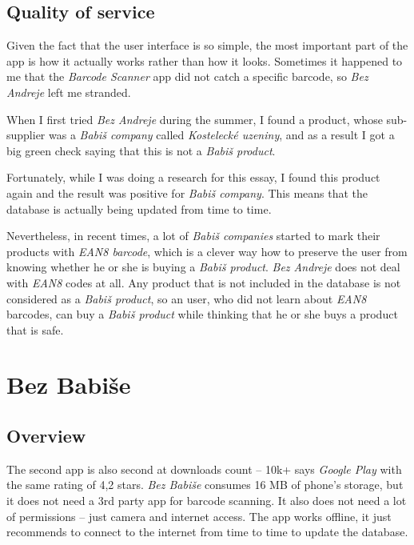 \documentclass[12pt]{article} %
\begin{document}

\subsection{Quality of service} %

Given the fact that the user interface is so simple, the most important part of the app is how it actually works rather than how it looks. Sometimes it happened to me that the \textit{Barcode Scanner} app did not catch a specific barcode, so \textit{Bez Andreje} left me stranded.

\newpage
When I first tried \textit{Bez Andreje} during the summer, I found a product, whose sub-supplier was a \textit{Babiš company} called \textit{Kostelecké uzeniny}, and as a result I got a big green check saying that this is not a \textit{Babiš product}.

Fortunately, while I was doing a research for this essay, I found this product again and the result was positive for \textit{Babiš company}. This means that the database is actually being updated from time to time. 

Nevertheless, in recent times, a lot of \textit{Babiš companies} started to mark their products with \textit{EAN8 barcode}, which is a clever way how to preserve the user from knowing whether he or she is buying a \textit{Babiš product}. \textit{Bez Andreje} does not deal with \textit{EAN8} codes at all. Any product that is not included in the database is not considered as a \textit{Babiš product}, so an user, who did not learn about \textit{EAN8} barcodes, can buy a \textit{Babiš product} while thinking that he or she buys a product that is safe.

\section{Bez Babiše}
\subsection{Overview}
The second app is also second at downloads count – 10k+ says \textit{Google Play} with the same rating of 4,2 stars. \textit{Bez Babiše} consumes 16 MB of phone’s storage, but it does not need a 3rd party app for barcode scanning. It also does not need a lot of permissions – just camera and internet access. The app works offline, it just recommends to connect to the internet from time to time to update the database.
\end{document}
